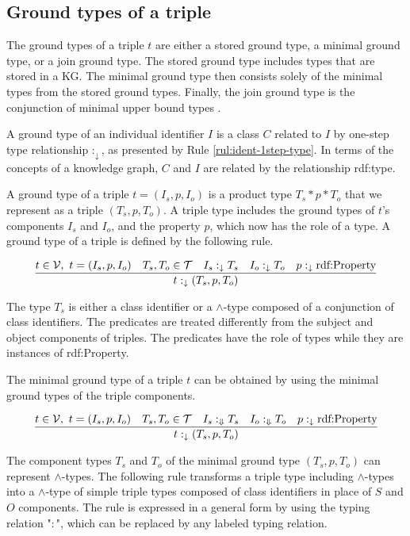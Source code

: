 \documentclass[runningheads]{llncs}
\newcommand{\darr}{\downarrow}
\newcommand{\Darr}{\Downarrow}
\newcommand{\V}{{\cal V}}
\newcommand{\T}{{\cal T}}
\begin{document}
\subsection{Ground types of a triple\label{sec:3-ground-types}}

\noindent
The ground types of a triple $t$ are either a stored ground type, a
minimal ground type, or a join ground type. The stored ground type
includes types that are stored in a KG. The minimal ground type then
consists solely of the minimal types from the stored ground
types. Finally, the join ground type is the conjunction of minimal
upper bound types \cite{Knudstorp2024}.
 
A ground type of an individual identifier $I$ is a class $C$ related
to $I$ by one-step type relationship $:_\darr$, as presented by Rule
\ref{rul:ident-1step-type}. In terms of the concepts of a knowledge
graph, $C$ and $I$ are related by the relationship rdf:type.

A ground type of a triple $t=(I_s,p,I_o)$ is a product type
$T_s*p*T_o$ that we represent as a triple $(T_s,p,T_o)$. A triple type
includes the ground types of $t$'s components $I_s$ and $I_o$, and the
property $p$, which now has the role of a type. A ground type of a
triple is defined by the following rule.

\begin{equation}
\label{rul:3-ground}
\dfrac{t\in\V,\ t=(I_s,p,I_o)\quad T_s,T_o\in\T\quad I_s:_\darr\/T_s\quad I_o:_\darr\/T_o\quad p:_\darr\text{rdf:Property}}
      {t:_\darr(T_s,p,T_o)}
\end{equation}

The type $T_s$ is either a class identifier or a $\land$-type composed
of a conjunction of class identifiers. The predicates are treated
differently from the subject and object components of triples. The
predicates have the role of types while they are instances of
rdf:Property.

The minimal ground type of a triple $t$ can be obtained by using the
minimal ground types of the triple components. 

\begin{equation}
\label{rul:3-min-ground}
\dfrac{t\in\V,\ t=(I_s,p,I_o)\quad T_s,T_o\in\T\quad I_s:_\Darr\/T_s\quad I_o:_\Darr\/T_o\quad p:_\darr\text{rdf:Property}}
      {t:_\darr\/(T_s,p,T_o)}
\end{equation}

The component types $T_s$ and $T_o$ of the minimal ground type
$(T_s,p,T_o)$ can represent $\land$-types. The following rule transforms
a triple type including $\land$-types into a $\land$-type of simple
triple types composed of class identifiers in place of $S$ and $O$
components. The rule is expressed in a general form by using the
typing relation "$:$", which can be replaced by any labeled typing
relation.
\end{document}
